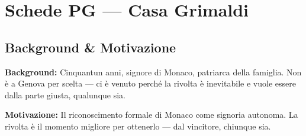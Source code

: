 \chapter{Schede PG --- Casa Grimaldi}



\section*{Background \& Motivazione}
\begin{rulebox}{}
\textbf{Background:} Cinquantun anni, signore di Monaco, patriarca della famiglia. Non \`e a Genova per scelta --- ci \`e venuto perch\'e la rivolta \`e inevitabile e vuole essere dalla parte giusta, qualunque sia.

\medskip\noindent\textcolor{GrimaldiPurple}{\textbf{Motivazione:}} Il riconoscimento formale di Monaco come signoria autonoma. La rivolta \`e il momento migliore per ottenerlo --- dal vincitore, chiunque sia.
\end{rulebox}

